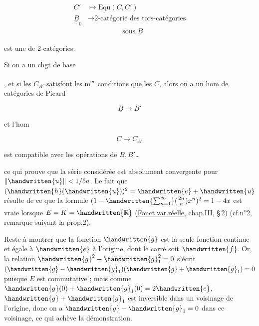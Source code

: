 \[
\begin{aligned}
C'&\longmapsto\underline{\mathrm{Equ}}(C,C')\\
\underline{\underline B}_0&\longrightarrow \text{2-catégorie des tors-catégories}\\
&\hspace{5em}\text{sous }\underline B
\end{aligned}
\]

est une  de $2$-catégories.

Si on a un chgt de base


, et si les $C_{A'}$ satisfont les m\textsuperscript{es} conditions que les $C$, alors on a un hom de  catégories de Picard

\[
\underline B\longrightarrow B'
\]

et l'hom 

\[
C\longrightarrow C_{A'}
\]

est compatible avec les opérations de $B,B'$\ldots


ce qui prouve que la série considérée est absolument convergente pour $\|\handwritten{u}\|<1/5a$. Le fait que $(\handwritten{h}(\handwritten{u}))^2=\handwritten{e}+\handwritten{u}$ résulte de ce que la formule $(1-\handwritten{\sum_{n=1}^{\infty}}(\genfrac{}{}{0pt}{}{2n}{n})x^n)^2=1-4x$ est vraie lorsque $E=K=\handwritten{\mathbb R}$ (\uline{Fonct.var.réelle}, chap.III, \S\,2) (cf.n\textsuperscript{o}2, remarque suivant la prop.2).

Reste à montrer que la fonction $\handwritten{g}$ est la seule fonction continue et égale à $\handwritten{e}$ à l'origine, dont le carré soit $\handwritten{f}$. Or, la relation $\handwritten{g}^2-\handwritten{g}_1^2=0$ s'écrit $(\handwritten{g}-\handwritten{g}_1)(\handwritten{g}+\handwritten{g}_1)=0$ puisque $E$ est commutative ; mais comme $\handwritten{g}(0)+\handwritten{g}_1(0)=2\handwritten{e}$, $\handwritten{g}+\handwritten{g}_1$ est inversible dans un voisinage de l'origine, donc on a $\handwritten{g}-\handwritten{g}_1=0$ dans ce voisinage, ce qui achève la démonstration.

